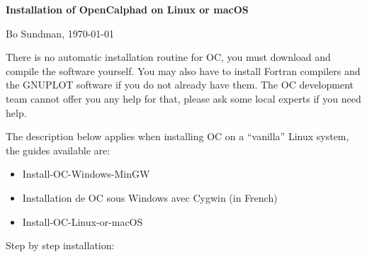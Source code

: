 \documentclass[12pt]{article}
\begin{document}
\begin{center}
{\Large \bf Installation of OpenCalphad on Linux or macOS}

Bo Sundman, \today

\end{center}

There is no automatic installation routine for OC, you must download
and compile the software yourself.  You may also have to install
Fortran compilers and the GNUPLOT software if you do not already have
them.  The OC development team cannot offer you any help for that,
please ask some local experts if you need help.

The description below applies when installing OC on a ``vanilla''
Linux system, the guides available are:
\begin{itemize}
\item Install-OC-Windows-MinGW
\item Installation de OC sous Windows avec Cygwin (in French)
\item Install-OC-Linux-or-macOS
\end{itemize}

Step by step installation:
\end{document}
